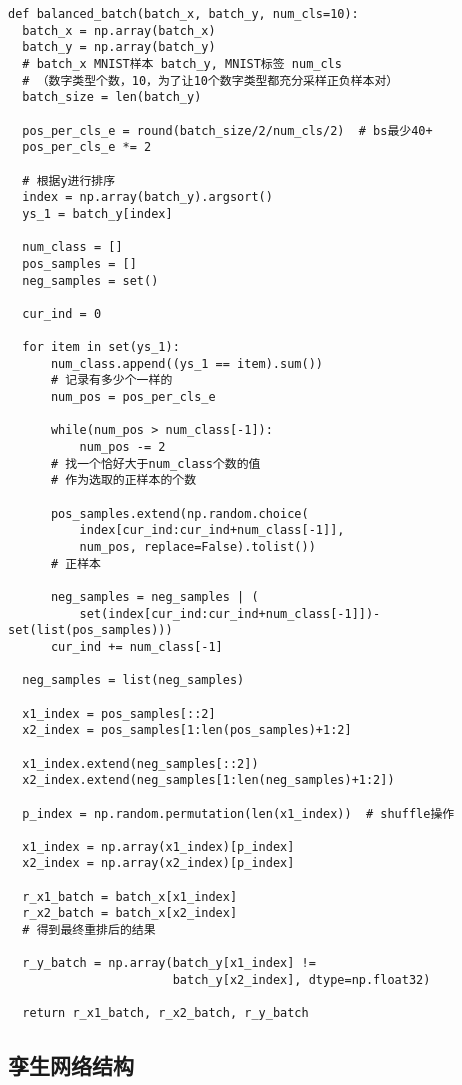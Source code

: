 \documentclass{article}
\begin{document}
\begin{lstlisting}
def balanced_batch(batch_x, batch_y, num_cls=10):
  batch_x = np.array(batch_x)
  batch_y = np.array(batch_y)
  # batch_x MNIST样本 batch_y, MNIST标签 num_cls
  # （数字类型个数，10，为了让10个数字类型都充分采样正负样本对）
  batch_size = len(batch_y)

  pos_per_cls_e = round(batch_size/2/num_cls/2)  # bs最少40+
  pos_per_cls_e *= 2

  # 根据y进行排序
  index = np.array(batch_y).argsort()
  ys_1 = batch_y[index]

  num_class = []
  pos_samples = []
  neg_samples = set()

  cur_ind = 0

  for item in set(ys_1):
      num_class.append((ys_1 == item).sum())
      # 记录有多少个一样的
      num_pos = pos_per_cls_e

      while(num_pos > num_class[-1]):
          num_pos -= 2
      # 找一个恰好大于num_class个数的值
      # 作为选取的正样本的个数

      pos_samples.extend(np.random.choice(
          index[cur_ind:cur_ind+num_class[-1]],
          num_pos, replace=False).tolist())
      # 正样本

      neg_samples = neg_samples | (
          set(index[cur_ind:cur_ind+num_class[-1]])-set(list(pos_samples)))
      cur_ind += num_class[-1]

  neg_samples = list(neg_samples)

  x1_index = pos_samples[::2]
  x2_index = pos_samples[1:len(pos_samples)+1:2]

  x1_index.extend(neg_samples[::2])
  x2_index.extend(neg_samples[1:len(neg_samples)+1:2])

  p_index = np.random.permutation(len(x1_index))  # shuffle操作

  x1_index = np.array(x1_index)[p_index]
  x2_index = np.array(x2_index)[p_index]

  r_x1_batch = batch_x[x1_index]
  r_x2_batch = batch_x[x2_index]
  # 得到最终重排后的结果

  r_y_batch = np.array(batch_y[x1_index] !=
                       batch_y[x2_index], dtype=np.float32)

  return r_x1_batch, r_x2_batch, r_y_batch
\end{lstlisting}

\subsection{孪生网络结构}
\end{document}
